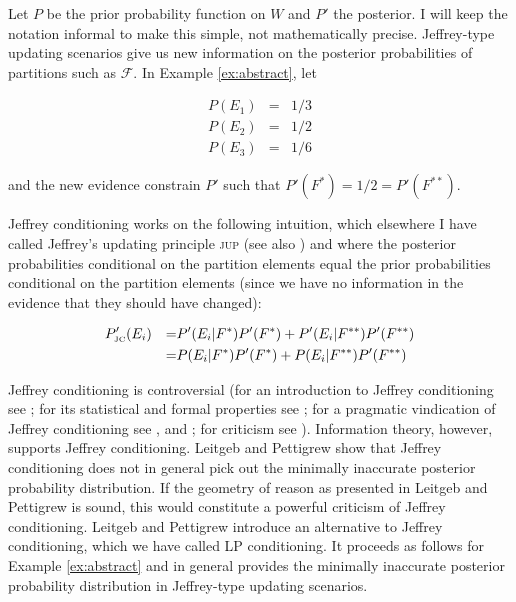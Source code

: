 \documentclass[11pt]{article}
\begin{document}
Let $P$ be the prior probability function on $W$ and $P'$ the
posterior. I will keep the notation informal to make this simple, not
mathematically precise. Jeffrey-type updating scenarios give us new
information on the posterior probabilities of partitions such as
$\mathcal{F}$. In Example \ref{ex:abstract}, let

\begin{equation}
  \label{eq:priors}
  \begin{array}{rcl}
    P(E_{1})&=&1/3 \\
    P(E_{2})&=&1/2 \\
    P(E_{3})&=&1/6
  \end{array}
\end{equation}

and the new evidence constrain $P'$ such that
$P'(F^{*})=1/2=P'(F^{**})$.

Jeffrey conditioning works on the following intuition, which elsewhere
I have called Jeffrey's updating principle \textsc{jup} (see also
) and where the posterior probabilities
conditional on the partition elements equal the prior probabilities
conditional on the partition elements (since we have no information in
the evidence that they should have changed):

\begin{align}
  \label{eq:jc}
  &P'_{\mbox{\tiny JC}}(E_{i})&=&P'(E_{i}|F^{*})P'(F^{*})+P'(E_{i}|F^{**})P'(F^{**})\notag \\
  &&=&P(E_{i}|F^{*})P'(F^{*})+P(E_{i}|F^{**})P'(F^{**})
\end{align}

Jeffrey conditioning is controversial (for an introduction to Jeffrey
conditioning see ; for its statistical and
formal properties see ; for a pragmatic
vindication of Jeffrey conditioning see , and
; for criticism see
). Information theory, however, supports
Jeffrey conditioning. Leitgeb and Pettigrew show that Jeffrey
conditioning does not in general pick out the minimally inaccurate
posterior probability distribution. If the geometry of reason as
presented in Leitgeb and Pettigrew is sound, this would constitute a
powerful criticism of Jeffrey conditioning. Leitgeb and Pettigrew
introduce an alternative to Jeffrey conditioning, which we have called
LP conditioning. It proceeds as follows for Example \ref{ex:abstract}
and in general provides the minimally inaccurate posterior probability
distribution in Jeffrey-type updating scenarios.
\end{document}
